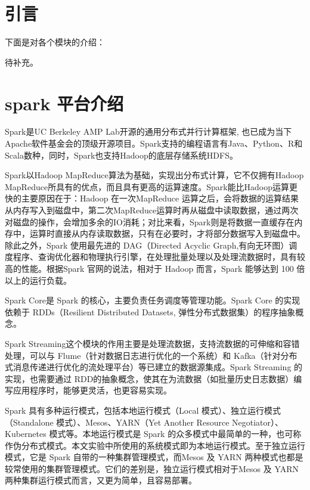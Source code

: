 \section{引言}
下面是对各个模块的介绍：

待补充。

\section{spark 平台介绍}
Spark是UC Berkeley AMP Lab开源的通用分布式并行计算框架, 也已成为当下Apache软件基金会的顶级开源项目。Spark支持的编程语言有Java、Python、R和Scala数种，同时，Spark也支持Hadoop的底层存储系统HDFS。

Spark以Hadoop MapReduce算法为基础，实现出分布式计算，它不仅拥有Hadoop MapReduce所具有的优点，而且具有更高的运算速度。Spark能比Hadoop运算更快的主要原因在于：Hadoop 在一次MapReduce 运算之后，会将数据的运算结果从内存写入到磁盘中，第二次MapReduce运算时再从磁盘中读取数据，通过两次对磁盘的操作，会增加多余的IO消耗；对比来看，Spark则是将数据一直缓存在内存中，运算时直接从内存读取数据，只有在必要时，才将部分数据写入到磁盘中。除此之外，Spark 使用最先进的 DAG（Directed Acyclic Graph,有向无环图）调度程序、查询优化器和物理执行引擎，在处理批量处理以及处理流数据时，具有较高的性能。根据Spark 官网的说法，相对于 Hadoop 而言，Spark 能够达到 100 倍以上的运行负载。




Spark Core是 Spark 的核心，主要负责任务调度等管理功能。Spark
Core 的实现依赖于 RDDs（Resilient Distributed Datasets,
弹性分布式数据集）的程序抽象概念。

Spark Streaming这个模块的作用主要是处理流数据，支持流数据的可伸缩和容错处理，可以与 Flume（针对数据日志进行优化的一个系统）和 Kafka（针对分布式消息传递进行优化的流处理平台）等已建立的数据源集成。Spark Streaming 的实现，也需要通过 RDD的抽象概念，使其在为流数据（如批量历史日志数据）编写应用程序时，能够更灵活，也更容易实现。

Spark 具有多种运行模式，包括本地运行模式（Local 模式）、独立运行模式（Standalone 模式）、Mesos、YARN（Yet Another Resource Negotiator）、Kubernetes 模式等。本地运行模式是 Spark 的众多模式中最简单的一种，也可称作伪分布式模式。本文实验中所使用的系统模式即为本地运行模式。至于独立运行模式，它是 Spark 自带的一种集群管理模式，而Mesos 及 YARN 两种模式也都是较常使用的集群管理模式。它们的差别是，独立运行模式相对于Mesos 及 YARN 两种集群运行模式而言，又更为简单，且容易部署。

